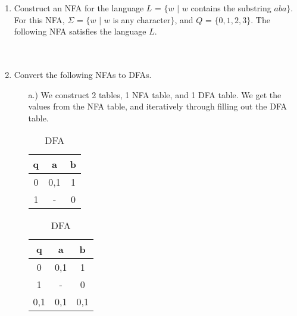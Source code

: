 \documentclass[12pt]{article}
\begin{document}
\begin{enumerate}
\item Construct an NFA for the language $L$ = $\{w $ $|$ $w$ contains the substring $aba\}$. \\

For this NFA, $\Sigma$ = $\{w $ $|$ $w$ is any character$ \}$, and $Q$ = $\{0 ,1, 2, 3\}$. The following NFA satisfies the language $L$. \\ \\ \\

	\pagebreak
	
	\item Convert the following NFAs to DFAs.
		\begin{itemize}
			\item[a.)] We construct 2 tables, 1 NFA table, and 1 DFA table. We get the values from the NFA table, and iteratively through filling out the DFA table.\\

\begin{table}[!htb]
    \caption{NFA to DFA}
    \begin{minipage}{.5\linewidth}
      \caption{NFA}
      \centering
        \begin{tabular}{c c c}
           q & a & b \\ \hline
	0 & 0,1 & 1 \\
	1 & - & 0  \\	
        \end{tabular}
    \end{minipage}%
    \begin{minipage}{.5\linewidth}
      \centering
        \caption{DFA}
        \begin{tabular}{c c c}
           q & a & b \\ \hline
	0 & 0,1 & 1 \\
	1 & - & 0  \\
	0,1 & 0,1 & 0,1 \\	
        \end{tabular}
    \end{minipage} 
\end{table}
	

\end{itemize}
\end{enumerate}
\end{document}
